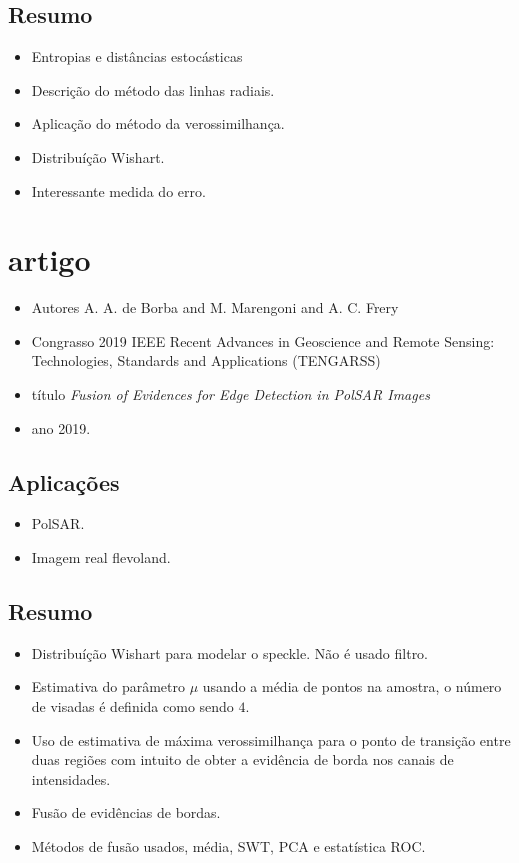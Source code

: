 \documentclass{article}
\begin{document}
\subsection{Resumo}
\begin{itemize}
\item Entropias e distâncias estocásticas
\item Descrição do método das linhas radiais.
\item Aplicação do método da verossimilhança.
\item Distribuíção Wishart.
\item Interessante medida do erro.
\end{itemize}

\section{artigo \cite{bmf_2019}}
\begin{itemize}
\item Autores A. A. {de Borba} and M. {Marengoni} and A. C. {Frery}
\item Congrasso  2019 IEEE Recent Advances in Geoscience and Remote Sensing: Technologies, Standards and Applications (TENGARSS)
\item título \textit{Fusion of Evidences for Edge Detection in {PolSAR} Images}
\item ano 2019.
\end{itemize}
\subsection{Aplicações}
\begin{itemize}
\item PolSAR.
\item Imagem real flevoland.
\end{itemize}
\subsection{Resumo}
\begin{itemize}
\item Distribuíção Wishart para modelar o speckle. Não é usado filtro.
\item Estimativa do parâmetro  $\mu$ usando a média de pontos na amostra, o número de visadas é definida como sendo $4$.
\item Uso de estimativa de máxima verossimilhança para o ponto de transição entre duas regiões com intuito de obter a evidência de borda nos canais de intensidades. 
\item Fusão de evidências de bordas.
\item Métodos de fusão usados, média, SWT, PCA e estatística ROC.
\end{itemize}
\end{document}

